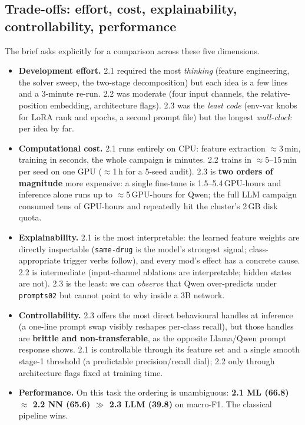 \documentclass[a4paper,11pt]{article}
\begin{document}
\subsection{Trade-offs: effort, cost, explainability, controllability, performance}
The brief asks explicitly for a comparison across these five dimensions.

\begin{itemize}
\item \textbf{Development effort.} 2.1 required the most \emph{thinking}
(feature engineering, the solver sweep, the two-stage decomposition) but
each idea is a few lines and a 3-minute re-run. 2.2 was moderate (four
input channels, the relative-position embedding, architecture flags).
2.3 was the \emph{least code} (env-var knobs for LoRA rank and epochs, a
second prompt file) but the longest \emph{wall-clock} per idea by far.
\item \textbf{Computational cost.} 2.1 runs entirely on CPU: feature
extraction $\approx$3\,min, training in seconds, the whole campaign
is minutes. 2.2 trains in $\approx$5--15\,min per seed on one GPU
($\approx$1\,h for a 5-seed audit). 2.3 is \textbf{two orders of
magnitude} more expensive: a single fine-tune is 1.5--5.4\,GPU-hours and
inference alone runs up to $\approx$5\,GPU-hours for Qwen; the full LLM
campaign consumed tens of GPU-hours and repeatedly hit the cluster's
2\,GB disk quota.
\item \textbf{Explainability.} 2.1 is the most interpretable: the
learned feature weights are directly inspectable (\texttt{same-drug} is
the model's strongest signal; class-appropriate trigger verbs follow),
and every mod's effect has a concrete cause. 2.2 is intermediate
(input-channel ablations are interpretable; hidden states are not). 2.3
is the least: we can \emph{observe} that Qwen over-predicts under
\texttt{prompts02} but cannot point to why inside a 3B network.
\item \textbf{Controllability.} 2.3 offers the most direct behavioural
handles at inference (a one-line prompt swap visibly reshapes per-class
recall), but those handles are \textbf{brittle and non-transferable},
as the opposite Llama/Qwen prompt response shows. 2.1 is controllable
through its feature set and a single smooth stage-1 threshold (a
predictable precision/recall dial); 2.2 only through architecture flags
fixed at training time.
\item \textbf{Performance.} On this task the ordering is unambiguous:
\textbf{2.1 ML (66.8) $\approx$ 2.2 NN (65.6) $\gg$ 2.3 LLM (39.8)} on
macro-F1. The classical pipeline wins.
\end{itemize}
\end{document}
